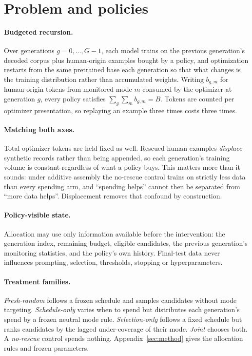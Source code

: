 \documentclass{article}
\begin{document}
\section{Problem and policies}
\label{sec:problem}

\paragraph{Budgeted recursion.}
Over generations $g=0,\ldots,G-1$, each model trains on the previous generation's decoded
corpus plus human-origin examples bought by a policy, and optimization restarts from the
same pretrained base each generation so that what changes is the training distribution
rather than accumulated weights. Writing $b_{g,m}$ for human-origin tokens from monitored
mode $m$ consumed by the optimizer at generation $g$, every policy satisfies
$\sum_{g}\sum_{m} b_{g,m}=B$. Tokens are counted per optimizer presentation, so replaying
an example three times costs three times.

\paragraph{Matching both axes.}
Total optimizer tokens are held fixed as well. Rescued human examples \emph{displace}
synthetic records rather than being appended, so each generation's training volume is
constant regardless of what a policy buys. This matters more than it sounds: under additive
assembly the no-rescue control trains on strictly less data than every spending arm, and
``spending helps'' cannot then be separated from ``more data helps''. Displacement removes
that confound by construction.

\paragraph{Policy-visible state.}
Allocation may use only information available before the intervention: the generation index,
remaining budget, eligible candidates, the previous generation's monitoring statistics, and
the policy's own history. Final-test data never influences prompting, selection, thresholds,
stopping or hyperparameters.

\paragraph{Treatment families.}
\emph{Fresh-random} follows a frozen schedule and samples candidates without mode targeting.
\emph{Schedule-only} varies when to spend but distributes each generation's spend by a frozen
neutral mode rule. \emph{Selection-only} follows a fixed schedule but ranks candidates by the
lagged under-coverage of their mode. \emph{Joint} chooses both. A \emph{no-rescue} control
spends nothing. Appendix~\ref{sec:method} gives the allocation rules and frozen parameters.
\end{document}
